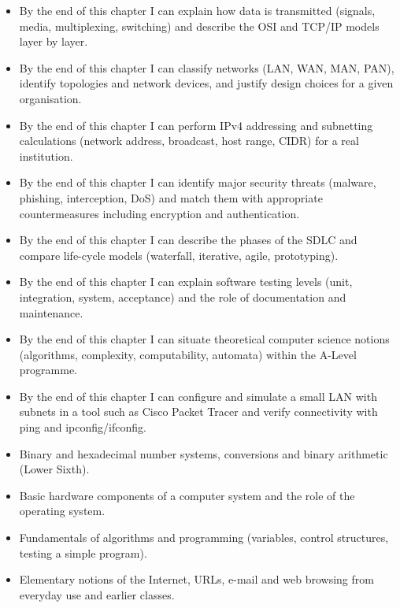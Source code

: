 \documentclass[11pt]{article}
\begin{document}
\begin{objectifs}
\begin{itemize}
\item By the end of this chapter I can explain how data is transmitted (signals, media, multiplexing, switching) and describe the OSI and TCP/IP models layer by layer.
\item By the end of this chapter I can classify networks (LAN, WAN, MAN, PAN), identify topologies and network devices, and justify design choices for a given organisation.
\item By the end of this chapter I can perform IPv4 addressing and subnetting calculations (network address, broadcast, host range, CIDR) for a real institution.
\item By the end of this chapter I can identify major security threats (malware, phishing, interception, DoS) and match them with appropriate countermeasures including encryption and authentication.
\item By the end of this chapter I can describe the phases of the SDLC and compare life-cycle models (waterfall, iterative, agile, prototyping).
\item By the end of this chapter I can explain software testing levels (unit, integration, system, acceptance) and the role of documentation and maintenance.
\item By the end of this chapter I can situate theoretical computer science notions (algorithms, complexity, computability, automata) within the A-Level programme.
\item By the end of this chapter I can configure and simulate a small LAN with subnets in a tool such as Cisco Packet Tracer and verify connectivity with ping and ipconfig/ifconfig.
\end{itemize}
\end{objectifs}

\begin{prerequis}
\begin{itemize}
\item Binary and hexadecimal number systems, conversions and binary arithmetic (Lower Sixth).
\item Basic hardware components of a computer system and the role of the operating system.
\item Fundamentals of algorithms and programming (variables, control structures, testing a simple program).
\item Elementary notions of the Internet, URLs, e-mail and web browsing from everyday use and earlier classes.
\end{itemize}
\end{prerequis}
\end{document}
